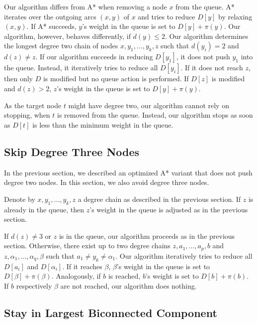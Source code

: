 \documentclass[letterpaper]{article} %
\begin{document}
Our algorithm differs from A* when removing a node $x$ from the queue.
A* iterates over the outgoing arcs $(x,y)$ of $x$ and tries to reduce $D[y]$ by relaxing $(x,y)$.
If A* succeeds, $y$'s weight in the queue is set to $D[y]+\pi(y)$.
Our algorithm, however, behaves differently, if $d(y)\le 2$.
Our algorithm determines the longest degree two chain of nodes $x,y_1,\ldots, y_k, z$ such that $d(y_i)=2$ and $d(z)\neq z$.
If our algorithm succeeds in reducing $D[y_1]$, it does not push $y_1$ into the queue.
Instead, it iteratively tries to reduce all $D[y_i]$.
If it does not reach $z$, then only $D$ is modified but no queue action is performed.
If $D[z]$ is modified and $d(z)>2$, $z$'s weight in the queue is set to $D[y]+\pi(y)$.

As the target node $t$ might have degree two, our algorithm cannot rely on stopping, when $t$ is removed from the queue.
Instead, our algorithm stops as soon as $D[t]$ is less than the minimum weight in the queue.

\subsection{Skip Degree Three Nodes}

In the previous section, we described an optimized A* variant that does not push degree two nodes.
In this section, we also avoid degree three nodes.

Denote by $x,y_1,\ldots, y_k, z$ a degree chain as described in the previous section.
If $z$ is already in the queue, then $z$'s weight in the queue is adjusted as in the previous section.

If $d(z)\neq 3$ or $z$ is in the queue, our algorithm proceeds as in the previous section.
Otherwise, there exist up to two degree chains $z,a_1,\ldots,a_p,b$ and $z,\alpha_1,\ldots,\alpha_q,\beta$ such that $a_1\neq y_k \neq \alpha_1$.
Our algorithm iteratively tries to reduce all $D[a_i]$ and $D[\alpha_i]$.
If it reaches $\beta$, $\beta$'s weight in the queue is set to $D[\beta]+\pi(\beta)$.
Analogously, if $b$ is reached, $b$'s weight is set to $D[b]+\pi(b)$.
If $b$ respectively $\beta$ are not reached, our algorithm does nothing.

\subsection{Stay in Largest Biconnected Component}

\label{sec:largested-biconnected-component}
\end{document}
